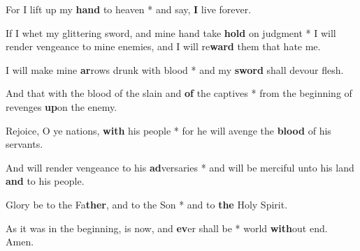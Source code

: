 \begin{multicols}{2}
	For I lift up my \textbf{hand} to heaven * and say, \textbf{I} live forever.
	
	If I whet my glittering sword, and mine hand take \textbf{hold} on judgment * I will render vengeance to mine enemies, and I will re\textbf{ward} them that hate me.
	
	I will make mine \textbf{ar}rows drunk with blood * and my \textbf{sword} shall devour flesh.
	
	And that with the blood of the slain and \textbf{of} the captives * from the beginning of revenges \textbf{up}on the enemy.
	
	Rejoice, O ye nations, \textbf{with} his people * for he will avenge the \textbf{blood} of his servants.
	
	And will render vengeance to his \textbf{ad}versaries * and will be merciful unto his land \textbf{and} to his people.
	
	Glory be to the Fa\textbf{ther}, and to the Son * and to \textbf{the} Holy Spirit.
	
	As it was in the beginning, is now, and \textbf{ev}er shall be * world \textbf{with}out end. Amen.
\end{multicols}